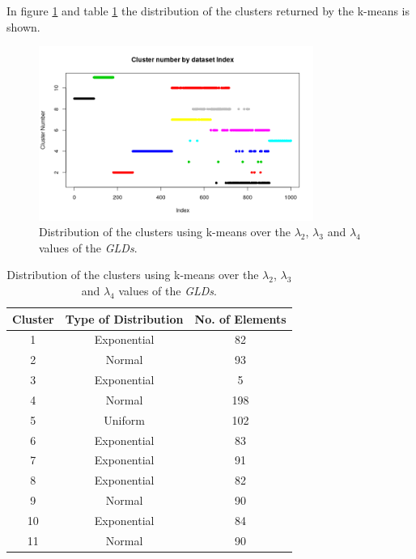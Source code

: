 In figure \ref{fig:dataset1_l2l3l4} and table \ref{tab:dataset1_l2l3l4} the distribution of the clusters returned by the k-means is shown.

\begin{figure}[H]
    \centering
    \includegraphics[width=0.8\textwidth]{img/gld_clustering/Dataset1/l2_l3_l4/intento_3/normal_exponential_uniform3.png}
    \caption{Distribution of the clusters using k-means over the $\lambda_{2}$, $\lambda_{3}$ and $\lambda_{4}$ values of the \textit{GLDs}.}
    \label{fig:dataset1_l2l3l4}
\end{figure}

\begin{table}[]
\centering
\caption{Distribution of the clusters using k-means over the $\lambda_{2}$, $\lambda_{3}$ and $\lambda_{4}$ values of the \textit{GLDs}.}
\label{tab:dataset1_l2l3l4}
\begin{tabular}{|c|c|c|}
\hline
Cluster & Type of Distribution & No. of Elements \\ \hline
1       & Exponential          & 82              \\ \hline
2       & Normal          & 93              \\ \hline
3       & Exponential          & 5             \\ \hline
4       & Normal               & 198              \\ \hline
5       & Uniform               & 102              \\ \hline
6       & Exponential               & 83             \\ \hline
7       & Exponential              & 91             \\ \hline
8       & Exponential          & 82              \\ \hline
9       & Normal          & 90               \\ \hline
10      & Exponential               & 84              \\ \hline
11      & Normal          & 90              \\ \hline
\end{tabular}
\end{table}

